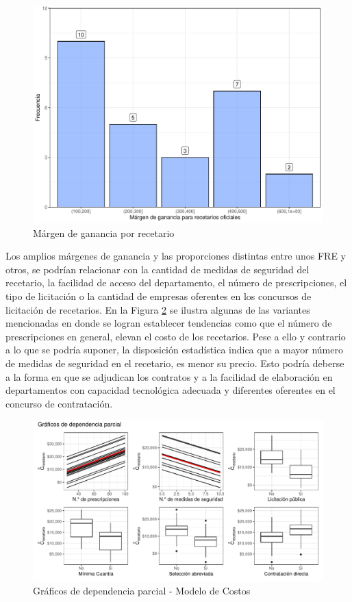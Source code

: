 \documentclass[
]{book}
\begin{document}
\begin{figure}

{\centering \includegraphics[width=1\linewidth]{InformeFinal_files/figure-latex/comparativoDepartamentos0-1} 

}

\caption{Márgen de ganancia por recetario}\label{fig:comparativoDepartamentos0}
\end{figure}

Los amplios márgenes de ganancia y las proporciones distintas entre unos FRE y otros, se podrían relacionar con la cantidad de medidas de seguridad del recetario, la facilidad de acceso del departamento, el número de prescripciones, el tipo de licitación o la cantidad de empresas oferentes en los concursos de licitación de recetarios. En la Figura \ref{fig:DependParcial1} se ilustra algunas de las variantes mencionadas en donde se logran establecer tendencias como que el número de prescripciones en general, elevan el costo de los recetarios. Pese a ello y contrario a lo que se podría suponer, la disposición estadística indica que a mayor número de medidas de seguridad en el recetario, es menor su precio. Esto podría deberse a la forma en que se adjudican los contratos y a la facilidad de elaboración en departamentos con capacidad tecnológica adecuada y diferentes oferentes en el concurso de contratación.

\begin{figure}
\includegraphics[width=0.9\linewidth]{InformeFinal_files/figure-latex/DependParcial1-1} \caption{Gráficos de dependencia parcial - Modelo de Costos}\label{fig:DependParcial1}
\end{figure}
\end{document}

